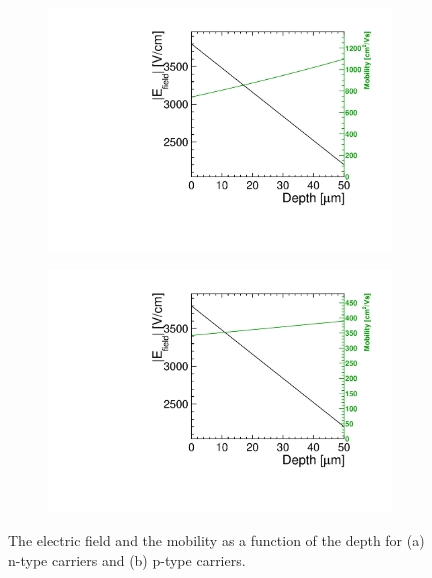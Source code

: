 \begin{figure}[htbp]
  \centering
  \begin{subfigure}[b]{0.45\textwidth}
    \includegraphics[width=\textwidth]{figures/ChargeSharing/Efield_mob_n_carrier.pdf}
    \caption{}
  \end{subfigure}\hfill
  \begin{subfigure}[b]{0.45\textwidth}
    \includegraphics[width=\textwidth]{figures/ChargeSharing/Efield_mob_p_carrier.pdf}
    \caption{}
  \end{subfigure}
  \caption{The electric field and the mobility as a function of the
    depth for (a) n-type carriers and (b) p-type
    carriers.}\label{fig:Efield_n_vs_p}
\end{figure}


